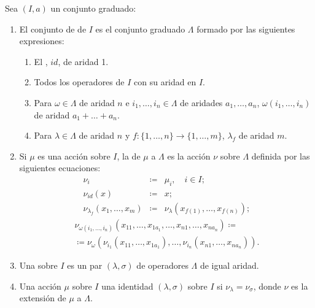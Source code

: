\begin{definition} Sea $(I, a)$ un conjunto graduado:
  \begin{enumerate}
  \item El conjunto de  de $I$ es el conjunto
    graduado $\Lambda$ formado por las siguientes expresiones:
    \begin{enumerate}
    \item El , $id$, de aridad 1.
    \item Todos los operadores de $I$ con su aridad en $I$.
    \item Para $\omega\in\Lambda$ de aridad $n$ e $i_1,\dots,i_n\in\Lambda$ de
      aridades $a_1,\dots,a_n$, $\omega(i_1,\dots,i_n)$ de aridad
      $a_1+\dots+a_n$.
    \item Para $\lambda\in \Lambda$ de aridad $n$ y
      $f:\{1,\dots,n\}\to\{1,\dots,m\}$, $\lambda_f$ de aridad $m$.
    \end{enumerate}
  \item Si $\mu$ es una acción sobre $I$, la  de $\mu$ a $\Lambda$ es
    la acción $\nu$ sobre $\Lambda$ definida por las siguientes ecuaciones:
    \bgroup
    \setlength{\belowdisplayskip}{0pt}
    \setlength{\abovedisplayskip}{0pt}
    \begin{eqnarray*}
      \nu_i & \coloneqq & \mu_i,\quad i\in I;\\
      \nu_{id}(x) & \coloneqq & x;\\
      \nu_{\lambda_f}(x_1,\dots,x_m) & \coloneqq & \nu_\lambda(x_{f(1)},\dots,x_{f(n)});
    \end{eqnarray*}
    \begin{multline*}
      \nu_{\omega(i_1,\dots,i_n)}(x_{11},\dots,x_{1a_1},\dots,x_{n1},\dots,x_{na_n})\coloneqq\\
      \coloneqq\nu_\omega(\nu_{i_1}(x_{11},\dots,x_{1a_1}),\dots,\nu_{i_n}(x_{n1},\dots,x_{na_n})).
    \end{multline*}
    \vspace{0pt}
    \egroup
  \item Una  sobre $I$ es un par $(\lambda,\sigma)$ de
    operadores $\Lambda$ de igual aridad.
  \item Una acción $\mu$ sobre $I$  una identidad
    $(\lambda, \sigma)$ sobre $I$ si $\nu_\lambda=\nu_\sigma$, donde $\nu$ es la
    extensión de $\mu$ a $\Lambda$.
  \end{enumerate}
\end{definition}

